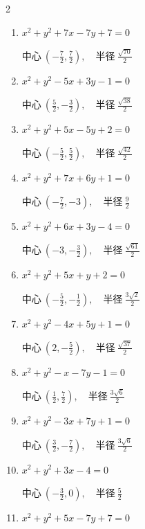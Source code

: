 \begin{multicols}{2}
\begin{enumerate}
  \item $x^{2}+y^{2}+7x-7y+7=0$

        $\displaystyle 中心\: \left(-\frac{7}{2},\frac{7}{2}\right), \quad 半径 \ \frac{\sqrt{70}}{2}$

  \item $x^{2}+y^{2}-5x+3y-1=0$

        $\displaystyle 中心\: \left(\frac{5}{2},-\frac{3}{2}\right), \quad 半径 \ \frac{\sqrt{38}}{2}$

  \item $x^{2}+y^{2}+5x-5y+2=0$

        $\displaystyle 中心\: \left(-\frac{5}{2},\frac{5}{2}\right), \quad 半径 \ \frac{\sqrt{42}}{2}$

  \item $x^{2}+y^{2}+7x+6y+1=0$

        $\displaystyle 中心\: \left(-\frac{7}{2},-3\right), \quad 半径 \ \frac{9}{2}$

  \item $x^{2}+y^{2}+6x+3y-4=0$

        $\displaystyle 中心\: \left(-3,-\frac{3}{2}\right), \quad 半径 \ \frac{\sqrt{61}}{2}$

  \item $x^{2}+y^{2}+5x+y+2=0$

        $\displaystyle 中心\: \left(-\frac{5}{2},-\frac{1}{2}\right), \quad 半径 \ \frac{3\sqrt{2}}{2}$

  \item $x^{2}+y^{2}-4x+5y+1=0$

        $\displaystyle 中心\: \left(2,-\frac{5}{2}\right), \quad 半径 \ \frac{\sqrt{37}}{2}$

  \item $x^{2}+y^{2}-x-7y-1=0$

        $\displaystyle 中心\: \left(\frac{1}{2},\frac{7}{2}\right), \quad 半径 \ \frac{3\sqrt{6}}{2}$

  \item $x^{2}+y^{2}-3x+7y+1=0$

        $\displaystyle 中心\: \left(\frac{3}{2},-\frac{7}{2}\right), \quad 半径 \ \frac{3\sqrt{6}}{2}$

  \item $x^{2}+y^{2}+3x-4=0$

        $\displaystyle 中心\: \left(-\frac{3}{2},0\right), \quad 半径 \ \frac{5}{2}$

  \item $x^{2}+y^{2}+5x-7y+7=0$


\end{enumerate}
\end{multicols}
